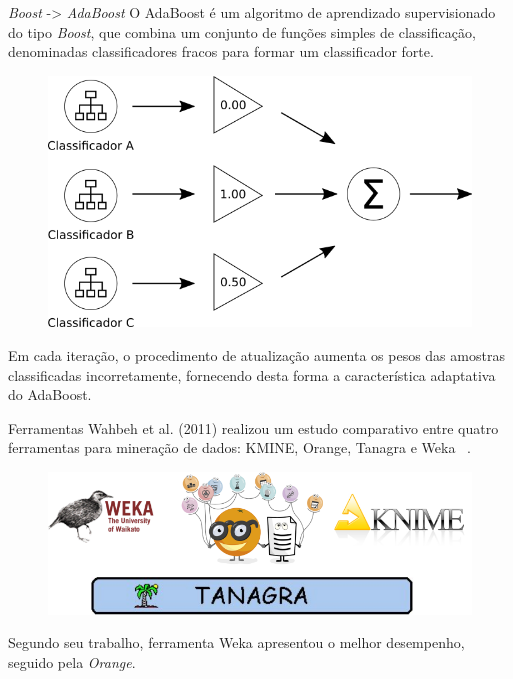 \documentclass[10pt]{beamer}
\begin{document}
  \begin{frame}[fragile]{\textit{Boost} -> \textit{AdaBoost}}
    O AdaBoost é um algoritmo de aprendizado supervisionado do tipo \textit{Boost}, que combina um conjunto de funções simples de classificação, denominadas classificadores fracos para formar um classificador forte.

    \begin{figure}[H]
    \begin{center}
        \includegraphics[scale=0.35]{images/boosting.png}
    \end{center}
    \end{figure}

    Em cada iteração, o procedimento de atualização aumenta os pesos das amostras classificadas incorretamente, fornecendo desta forma a característica adaptativa do AdaBoost.

  \end{frame}

  \begin{frame}[fragile]{Ferramentas}
    Wahbeh et al. (2011) realizou um estudo comparativo entre quatro ferramentas para mineração de dados: KMINE, Orange, Tanagra e Weka ~\cite{wahbeh2011comparison}.

    \begin{figure}[H]
    \begin{center}
        \includegraphics[scale=0.45]{images/tools_data_mining.png}
    \end{center}
    \end{figure}

    Segundo seu trabalho, ferramenta Weka apresentou o melhor desempenho, seguido pela \textit{Orange}.
  \end{frame}
\end{document}

